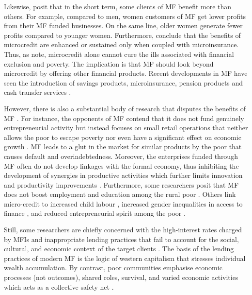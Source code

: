 \documentclass[a4paper, nobind]{templates/ociamthesis}
\begin{document}
Likewise, \textcite{beck2018benefits} posit that in the short term, some clients of MF benefit more than others. For example, compared to men, women customers of MF get lower profits from their MF funded businesses. On the same line, older women generate fewer profits compared to younger women. Furthermore, \textcite{akotey2016does} conclude that the benefits of microcredit are enhanced or sustained only when coupled with microinsurance. Thus, as \textcite{onyuma2005myths} note, microcredit alone cannot cure the ills associated with financial exclusion and poverty. The implication is that MF should look beyond microcredit by offering other financial products. Recent developments in MF have seen the introduction of savings products, microinsurance, pension products and cash transfer services \autocite{chandrasekhar2015microsavings}.

However, there is also a substantial body of research that disputes the benefits of MF \autocite{bateman2010doesn,bauchet2013micro}. For instance, the opponents of MF contend that it does not fund genuinely entrepreneurial activity but instead focuses on small retail operations that neither allows the poor to escape poverty nor even have a significant effect on economic growth \autocite{beck2018benefits}. MF leads to a glut in the market for similar products by the poor that causes default and overindebtedness. Moreover, the enterprises funded through MF often do not develop linkages with the formal economy, thus inhibiting the development of synergies in productive activities which further limits innovation and productivity improvements \autocite{ghosh2013microfinance}. Furthermore, some researchers posit that MF does not boost employment and education among the rural poor \autocite{bauchet2013micro}. Others link micro-credit to increased child labour \textcite{hazarika2008household}, increased gender inequalities in access to finance \autocite{zulfiqar2017does}, and reduced entrepreneurial spirit among the poor \autocite{field2013does}.

Still, some researchers are chiefly concerned with the high-interest rates charged by MFIs and inappropriate lending practices that fail to account for the social, cultural, and economic context of the target clients \autocite{chester2016one}. The basis of the lending practices of modern MF is the logic of western capitalism that stresses individual wealth accumulation. By contrast, poor communities emphasise economic processes (not outcomes), shared roles, survival, and varied economic activities which acts as a collective safety net \autocite{chester2016one}.
\end{document}
